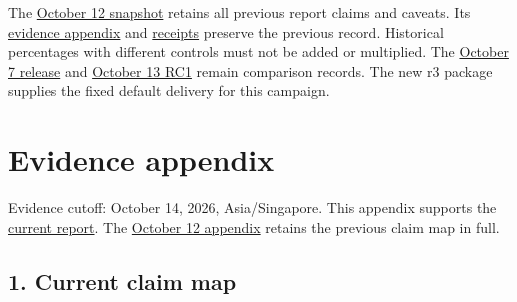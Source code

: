 \documentclass[10pt,a4paper]{article}
\begin{document}
The
\href{https://github.com/MoyaMryia/riscv-accl/blob/main/spacemit/reports/snapshots/2026-10-12/SUBMISSION-REPORT.pdf}{October
12 snapshot} retains all previous report claims and caveats. Its
\href{https://github.com/MoyaMryia/riscv-accl/blob/main/spacemit/reports/snapshots/2026-10-12/SUBMISSION-EVIDENCE.md}{evidence
appendix} and
\href{https://github.com/MoyaMryia/riscv-accl/blob/main/spacemit/reports/snapshots/2026-10-12/receipts.json}{receipts}
preserve the previous record. Historical percentages with different
controls must not be added or multiplied. The
\href{https://github.com/MoyaMryia/riscv-accl/blob/main/spacemit/reports/2026-10-07-release-verification.md}{October
7 release} and
\href{https://github.com/MoyaMryia/riscv-accl/blob/main/spacemit/reports/2026-10-13-unified-release-candidate.md}{October
13 RC1} remain comparison records. The new r3 package supplies the fixed
default delivery for this campaign.

\clearpage

\hypertarget{evidence-appendix}{%
\section{Evidence appendix}\label{evidence-appendix}}

Evidence cutoff: October 14, 2026, Asia/Singapore. This appendix
supports the
\href{https://github.com/MoyaMryia/riscv-accl/blob/main/spacemit/reports/SUBMISSION-REPORT.md}{current
report}. The
\href{https://github.com/MoyaMryia/riscv-accl/blob/main/spacemit/reports/snapshots/2026-10-12/SUBMISSION-EVIDENCE.md}{October
12 appendix} retains the previous claim map in full.

\hypertarget{current-claim-map}{%
\subsection{1. Current claim map}\label{current-claim-map}}
\end{document}
